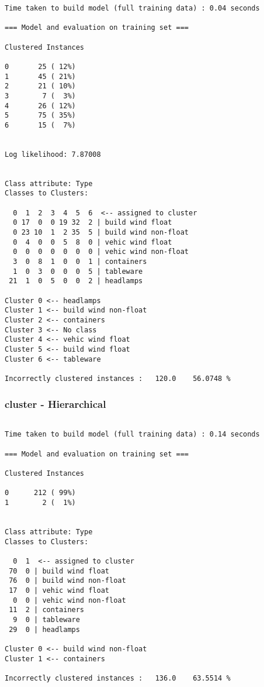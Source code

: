 \documentclass[a4paper]{article}
\begin{document}
\begin{verbatim}
Time taken to build model (full training data) : 0.04 seconds

=== Model and evaluation on training set ===

Clustered Instances

0       25 ( 12%)
1       45 ( 21%)
2       21 ( 10%)
3        7 (  3%)
4       26 ( 12%)
5       75 ( 35%)
6       15 (  7%)


Log likelihood: 7.87008


Class attribute: Type
Classes to Clusters:

  0  1  2  3  4  5  6  <-- assigned to cluster
  0 17  0  0 19 32  2 | build wind float
  0 23 10  1  2 35  5 | build wind non-float
  0  4  0  0  5  8  0 | vehic wind float
  0  0  0  0  0  0  0 | vehic wind non-float
  3  0  8  1  0  0  1 | containers
  1  0  3  0  0  0  5 | tableware
 21  1  0  5  0  0  2 | headlamps

Cluster 0 <-- headlamps
Cluster 1 <-- build wind non-float
Cluster 2 <-- containers
Cluster 3 <-- No class
Cluster 4 <-- vehic wind float
Cluster 5 <-- build wind float
Cluster 6 <-- tableware

Incorrectly clustered instances :	120.0	 56.0748 %

\end{verbatim}


\subsubsection{cluster - Hierarchical}

\begin{verbatim}

Time taken to build model (full training data) : 0.14 seconds

=== Model and evaluation on training set ===

Clustered Instances

0      212 ( 99%)
1        2 (  1%)


Class attribute: Type
Classes to Clusters:

  0  1  <-- assigned to cluster
 70  0 | build wind float
 76  0 | build wind non-float
 17  0 | vehic wind float
  0  0 | vehic wind non-float
 11  2 | containers
  9  0 | tableware
 29  0 | headlamps

Cluster 0 <-- build wind non-float
Cluster 1 <-- containers

Incorrectly clustered instances :	136.0	 63.5514 %

\end{verbatim}
\end{document}
